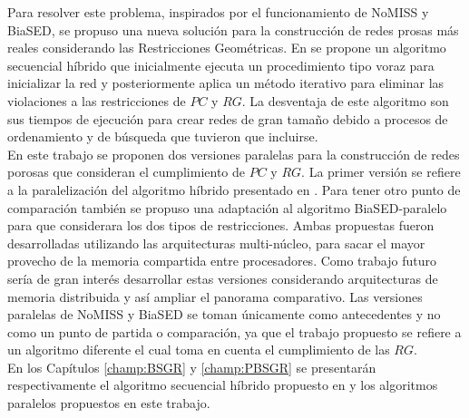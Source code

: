 Para resolver este problema, inspirados por el funcionamiento de NoMISS y BiaSED, se propuso una nueva  solución \cite{ref17} para la construcción de redes prosas más reales considerando las Restricciones Geométricas. En \cite{ref17} se propone un algoritmo secuencial h\'ibrido que inicialmente ejecuta un procedimiento 
tipo voraz para inicializar la red y posteriormente aplica un m\'etodo iterativo para eliminar las violaciones a las restricciones de $PC$ y $RG$.
La desventaja de este algoritmo son sus tiempos de ejecuci\'on para crear redes de gran tama\~no debido a procesos de ordenamiento y
de b\'usqueda que tuvieron que incluirse.\\

En este trabajo se proponen dos versiones paralelas para la construcci\'on de redes porosas que consideran el cumplimiento de $PC$ y $RG$.
La primer versi\'on se refiere a la paralelizaci\'on del algoritmo h\'ibrido presentado en \cite{ref17}. Para tener otro punto 
de comparaci\'on tambi\'en se propuso una adaptaci\'on al algoritmo BiaSED-paralelo para que considerara los dos tipos de restricciones.
Ambas propuestas fueron desarrolladas utilizando las arquitecturas multi-núcleo, para sacar el mayor provecho de la memoria compartida
entre procesadores. Como trabajo futuro ser\'ia de gran inter\'es desarrollar estas versiones considerando arquitecturas de memoria distribuida
y as\'i ampliar el panorama comparativo. Las versiones paralelas de NoMISS y BiaSED se toman únicamente como antecedentes y no como un punto de partida o comparación, ya que el trabajo propuesto se refiere a un algoritmo diferente el cual toma en cuenta el cumplimiento de las $RG$. \\

En los Capítulos \ref{champ:BSGR} y \ref{champ:PBSGR} se presentar\'an respectivamente el algoritmo secuencial h\'ibrido propuesto en \cite{ref17} y los algoritmos paralelos propuestos en este trabajo.


